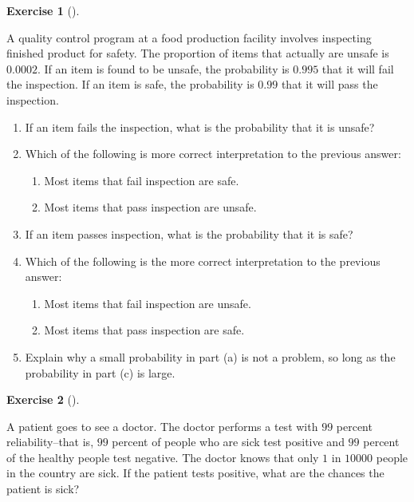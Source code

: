 \documentclass[
  letterpaper,
  DIV=11,
  numbers=noendperiod]{scrreprt}
\providecommand{\tightlist}{%
  \setlength{\itemsep}{0pt}\setlength{\parskip}{0pt}}\usepackage{longtable,booktabs,array}
\theoremstyle{definition}
\theoremstyle{definition}
\newtheorem{exercise}{Exercise}[chapter]
\theoremstyle{definition}
\theoremstyle{remark}
\begin{document}
\begin{exercise}[]\protect\hypertarget{exr-4.11}{}\label{exr-4.11}

A quality control program at a food production facility involves
inspecting finished product for safety. The proportion of items that
actually are unsafe is \(0.0002\). If an item is found to be unsafe, the
probability is \(0.995\) that it will fail the inspection. If an item is
safe, the probability is \(0.99\) that it will pass the inspection.

\begin{enumerate}
\def\labelenumi{\alph{enumi}.}
\tightlist
\item
  If an item fails the inspection, what is the probability that it is
  unsafe?
\item
  Which of the following is more correct interpretation to the previous
  answer:

  \begin{enumerate}
  \def\labelenumii{\roman{enumii}.}
  \tightlist
  \item
    Most items that fail inspection are safe.
  \item
    Most items that pass inspection are unsafe.
  \end{enumerate}
\item
  If an item passes inspection, what is the probability that it is safe?
\item
  Which of the following is the more correct interpretation to the
  previous answer:

  \begin{enumerate}
  \def\labelenumii{\roman{enumii}.}
  \tightlist
  \item
    Most items that fail inspection are unsafe.
  \item
    Most items that pass inspection are safe.
  \end{enumerate}
\item
  Explain why a small probability in part (a) is not a problem, so long
  as the probability in part (c) is large.
\end{enumerate}

\end{exercise}

\begin{exercise}[]\protect\hypertarget{exr-4.12}{}\label{exr-4.12}

A patient goes to see a doctor. The doctor performs a test with \(99\)
percent reliability--that is, \(99\) percent of people who are sick test
positive and \(99\) percent of the healthy people test negative. The
doctor knows that only \(1\) in \(10000\) people in the country are
sick. If the patient tests positive, what are the chances the patient is
sick?

\end{exercise}
\end{document}
